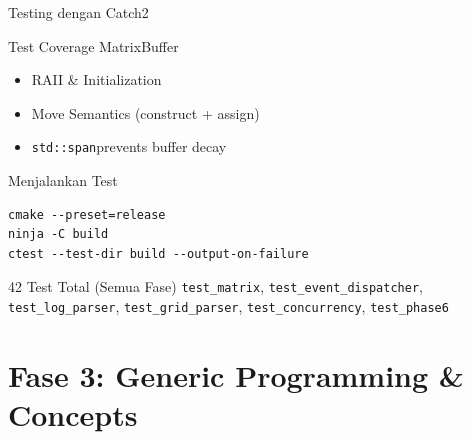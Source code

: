 \documentclass[aspectratio=169,10pt]{beamer}
\newcommand{\stdspan}{\texttt{std::span}}
\begin{document}
\begin{frame}[fragile]{Testing dengan Catch2}
  \begin{block}{Test Coverage MatrixBuffer}
    \begin{itemize}
      \item RAII \& Initialization
      \item Move Semantics (construct + assign)
      \item \stdspan prevents buffer decay
    \end{itemize}
  \end{block}
  
  \begin{exampleblock}{Menjalankan Test}
    \begin{verbatim}
cmake --preset=release
ninja -C build
ctest --test-dir build --output-on-failure
    \end{verbatim}
  \end{exampleblock}
  
  \vspace{0.3cm}
  \begin{alertblock}{42 Test Total (Semua Fase)}
    \texttt{test\_matrix}, \texttt{test\_event\_dispatcher}, \texttt{test\_log\_parser}, 
    \texttt{test\_grid\_parser}, \texttt{test\_concurrency}, \texttt{test\_phase6}
  \end{alertblock}
\end{frame}

\section{Fase 3: Generic Programming \& Concepts}
\end{document}
